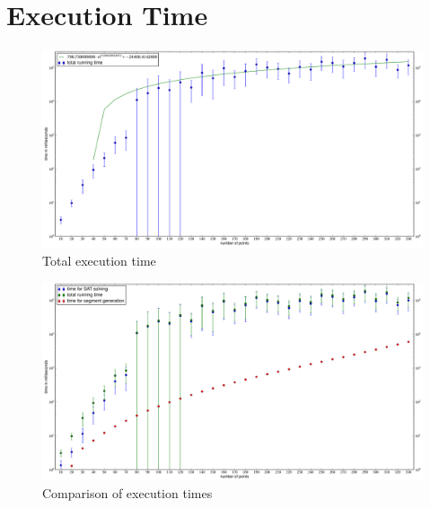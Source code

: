 \section{Execution Time}

\begin{landscape}
\begin{figure}[ht]
  \centering
  \includegraphics[width=\linewidth,height=\textheight,keepaspectratio]{results/time_total.pdf}
  \caption{\label{fig:time_total}Total execution time}
\end{figure}

\begin{figure}[ht]
  \centering
  \includegraphics[width=\linewidth,height=\textheight,keepaspectratio]{results/time_comparison.pdf}
  \caption{\label{fig:time_comparison}Comparison of execution times}
\end{figure}


\end{landscape}
